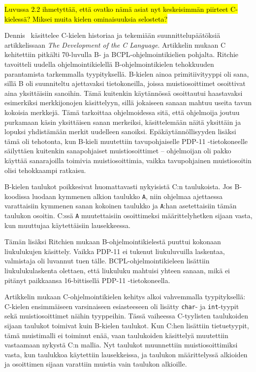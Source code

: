 \hl{ Luvussa 2.2 ihmetyttää, että ovatko nämä asiat nyt keskeisimmän piirteet
C-kielessä? Miksei muita kielen ominaisuuksia selosteta? }

Dennis~\citet{chistory} käsittelee C-kielen historiaa ja tekemiään
suunnittelupäätöksiä artikkelissaan \emph{The Development of the C Language}.
Artikkelin mukaan C kehitettiin pitkälti 70-luvulla B- ja
BCPL-ohjelmointikielien pohjalta. Ritchie tavoitteli uudella
ohjelmointikielellä B-ohjelmointikielen tehokkuuden parantamista tarkemmalla
tyypityksellä. B-kielen ainoa primitiivityyppi oli sana, sillä B oli suunniteltu ajettavaksi
tietokoneilla, joissa muistiosoittimet osoittivat aina yksittäisiin sanoihin.
Tämä kuitenkin käytännössä osoittautui haastavaksi esimerkiksi merkkijonojen
käsittelyyn, sillä jokaiseen sanaan mahtuu useita tavun kokoisia merkkejä. Tämä
tarkoittaa ohjelmoidessa sitä, että ohjelmoija joutuu purkamaan käsin
yksittäisen sanan merkeiksi, käsittelemään näitä yksittäin ja lopuksi
yhdistämään merkit uudelleen sanoiksi. Epäkäytännöllisyyden lisäksi tämä oli
tehotonta, kun B-kieli muutettiin tavupohjaiselle PDP-11 -tietokoneelle
säilyttäen kuitenkin sanapohjaiset muistiosoittimet -- ohjelmoijan oli pakko
käyttää sanarajoilla toimivia muistiosoittimia, vaikka tavupohjainen
muistiosoitin olisi tehokkaampi ratkaisu.

B-kielen taulukot poikkesivat huomattavasti nykyisistä C:n taulukoista. Jos
B-koodissa luodaan kymmenen alkion taulukko \texttt{A}, niin ohjelmaa
ajettaessa varattaisiin kymmenen sanan kokoinen taulukko ja \texttt{A}:han
asetettaisiin tämän taulukon osoitin. C:ssä \texttt{A} muutettaisiin
osoittimeksi määrittelyhetken sijaan vasta, kun muuttujaa käytettäisiin
lausekkeessa.

Tämän lisäksi Ritchien mukaan B-ohjelmointikielestä puuttui kokonaan
liukulukujen käsittely. Vaikka PDP-11 ei tukenut liukuluvuilla laskentaa,
valmistaja oli luvannut tuen tälle. BCPL-ohjelmointikieleen lisättiin
liukulukulaskenta olettaen, että liukuluku mahtuisi yhteen sanaan, mikä ei
pitänyt paikkaansa 16-bittisellä PDP-11 -tietokoneella.

\grayrule

Artikkelin mukaan C-ohjelmointikielen kehitys alkoi vahvemmalla tyypityksellä:
C-kielen ensimmäiseen varsinaiseen esiasteeseen oli lisätty \texttt{char}- ja
\texttt{int}-tyypit sekä muistiosoittimet näihin tyyppeihin. Tässä vaiheessa
C-tyylisten taulukoiden sijaan taulukot toimivat kuin B-kielen taulukot. Kun
C:hen lisättiin tietuetyypit, tämä muistimalli ei toiminut enää, vaan
taulukoiden käsittelyä muutettiin vastaamaan nykystä C:n mallia. Nyt taulukot
muunnettiin muistiosoittimiksi vasta, kun taulukkoa käytettiin lausekkeissa, ja
taulukon määrittelyssä alkioiden ja osoittimen sijaan varattiin muistia vain
taulukon alkioille.

